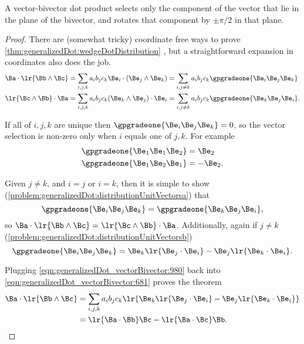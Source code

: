 A vector-bivector dot product selects only the component of the vector that lie in the plane of the bivector, and rotates that component by \( \pm \pi/2 \) in that plane.
\begin{proof}
There are (somewhat tricky) coordinate free ways to prove
\cref{thm:generalizedDot:wedgeDotDistribution}
, but a straightforward expansion in coordinates also does the job.
\begin{equation}\label{eqn:generalizedDot_vectorBivector:681}
\begin{aligned}
\Ba \cdot \lr{ \Bb \wedge \Bc } &= \sum_{i, j, k} a_i b_j c_k \Be_i \cdot (\Be_j \wedge \Be_k)
= \sum_{i, j \ne k} a_i b_j c_k \gpgradeone{ \Be_i \Be_j \Be_k }
\\
\lr{ \Bc \wedge \Bb } \cdot \Ba &= \sum_{i, j, k} a_i b_j c_k (\Be_k \wedge \Be_j) \cdot \Be_i
= \sum_{i, j \ne k} a_i b_j c_k \gpgradeone{ \Be_k \Be_j \Be_i }.
\end{aligned}
\end{equation}

If all of \( i, j, k \) are unique then \( \gpgradeone{ \Be_i \Be_j \Be_k } = 0 \), so the vector selection is non-zero only when \( i \) equals one of \( j, k \).
For example
\begin{equation}\label{eqn:generalizedDot_vectorBivector:1040}
\begin{aligned}
\gpgradeone{ \Be_1 \Be_1 \Be_2 } &= \Be_2 \\
\gpgradeone{ \Be_1 \Be_2 \Be_1 } &= -\Be_2.
\end{aligned}
\end{equation}

Given \( j \ne k \), and \( i = j \) or \( i = k \),  then it is simple to show
(\cref{problem:generalizedDot:distributionUnitVectorsa})
that
\begin{equation}\label{eqn:generalizedDot_vectorBivector:1020}
\gpgradeone{ \Be_i \Be_j \Be_k }
= \gpgradeone{ \Be_k \Be_j \Be_i },
\end{equation}
so \( \Ba \cdot \lr{ \Bb \wedge \Bc } = \lr{ \Bc \wedge \Bb } \cdot \Ba \).
Additionally, again if \( j \ne k \)
(\cref{problem:generalizedDot:distributionUnitVectorsb})
\begin{equation}\label{eqn:generalizedDot_vectorBivector:980}
\gpgradeone{ \Be_i \Be_j \Be_k }
=
\Be_k \lr{ \Be_j \cdot \Be_i }
-\Be_j \lr{ \Be_k \cdot \Be_i }.
\end{equation}

Plugging \cref{eqn:generalizedDot_vectorBivector:980} back into \cref{eqn:generalizedDot_vectorBivector:681} proves the theorem
\begin{equation}\label{eqn:generalizedDot_vectorBivector:1060}
\begin{aligned}
\Ba \cdot \lr{ \Bb \wedge \Bc }
&= \sum_{i, j, k} a_i b_j c_k \lr{ \Be_k \lr{ \Be_j \cdot \Be_i } -\Be_j \lr{ \Be_k \cdot \Be_i } } \\
&= \lr{ \Ba \cdot \Bb } \Bc - \lr{ \Ba \cdot \Bc } \Bb.
\end{aligned}
\end{equation}
\end{proof}

